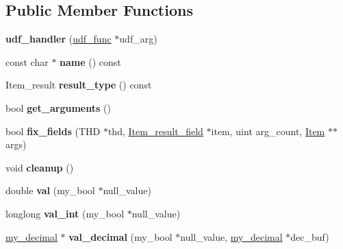\subsection*{Public Member Functions}
\begin{DoxyCompactItemize}
\item 
\mbox{\label{classudf__handler_acc12e1e3f1a282c3ed6a16845c955301}} 
{\bfseries udf\+\_\+handler} (\mbox{\hyperlink{structst__udf__func}{udf\+\_\+func}} $\ast$udf\+\_\+arg)
\item 
\mbox{\label{classudf__handler_a00b97e2e518ef49e3d51b8b523734ba4}} 
const char $\ast$ {\bfseries name} () const
\item 
\mbox{\label{classudf__handler_a1842a09a8f004b28bdf6714115b0cd6b}} 
Item\+\_\+result {\bfseries result\+\_\+type} () const
\item 
\mbox{\label{classudf__handler_ad763cb7b61d67825818a7b94928ad4ca}} 
bool {\bfseries get\+\_\+arguments} ()
\item 
\mbox{\label{classudf__handler_a66207d8b341e44708356100a1a988f6c}} 
bool {\bfseries fix\+\_\+fields} (T\+HD $\ast$thd, \mbox{\hyperlink{classItem__result__field}{Item\+\_\+result\+\_\+field}} $\ast$item, uint arg\+\_\+count, \mbox{\hyperlink{classItem}{Item}} $\ast$$\ast$args)
\item 
\mbox{\label{classudf__handler_a85a382f080d79fcb1652466f207164eb}} 
void {\bfseries cleanup} ()
\item 
\mbox{\label{classudf__handler_a3cf970e515d530c9e24c3f1511959079}} 
double {\bfseries val} (my\+\_\+bool $\ast$null\+\_\+value)
\item 
\mbox{\label{classudf__handler_aa8e009c17a414343969729f17ce6d888}} 
longlong {\bfseries val\+\_\+int} (my\+\_\+bool $\ast$null\+\_\+value)
\item 
\mbox{\label{classudf__handler_aec38b621c7fcb3cb833d7d0c53bef11c}} 
\mbox{\hyperlink{classmy__decimal}{my\+\_\+decimal}} $\ast$ {\bfseries val\+\_\+decimal} (my\+\_\+bool $\ast$null\+\_\+value, \mbox{\hyperlink{classmy__decimal}{my\+\_\+decimal}} $\ast$dec\+\_\+buf)
$$
\end{DoxyCompactItemize}
